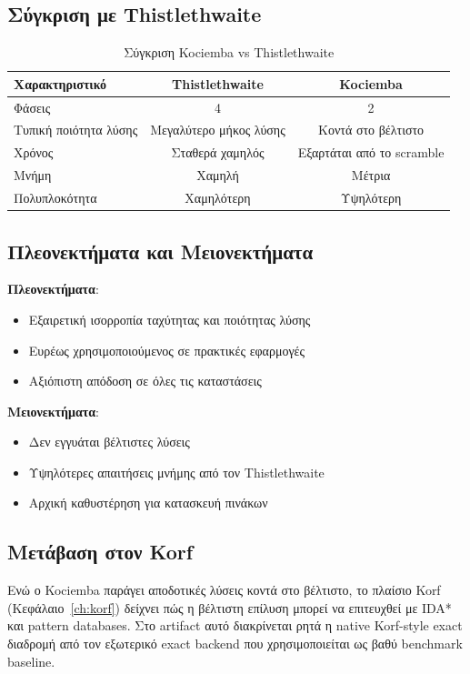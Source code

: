 \subsection{Σύγκριση με Thistlethwaite}

\begin{table}[h]
\centering
\caption{Σύγκριση Kociemba vs Thistlethwaite}
\label{tab:kociemba_vs_thistlethwaite}
\begin{tabular}{lcc}
\toprule
\textbf{Χαρακτηριστικό} & \textbf{Thistlethwaite} & \textbf{Kociemba} \\
\midrule
Φάσεις & 4 & 2 \\
Τυπική ποιότητα λύσης & Μεγαλύτερο μήκος λύσης & Κοντά στο βέλτιστο \\
Χρόνος & Σταθερά χαμηλός & Εξαρτάται από το scramble \\
Μνήμη & Χαμηλή & Μέτρια \\
Πολυπλοκότητα & Χαμηλότερη & Υψηλότερη \\
\bottomrule
\end{tabular}
\end{table}

\subsection{Πλεονεκτήματα και Μειονεκτήματα}

\textbf{Πλεονεκτήματα}:
\begin{itemize}
    \item Εξαιρετική ισορροπία ταχύτητας και ποιότητας λύσης
    \item Ευρέως χρησιμοποιούμενος σε πρακτικές εφαρμογές
    \item Αξιόπιστη απόδοση σε όλες τις καταστάσεις
\end{itemize}

\textbf{Μειονεκτήματα}:
\begin{itemize}
    \item Δεν εγγυάται βέλτιστες λύσεις
    \item Υψηλότερες απαιτήσεις μνήμης από τον Thistlethwaite
    \item Αρχική καθυστέρηση για κατασκευή πινάκων
\end{itemize}

\subsection{Μετάβαση στον Korf}

Ενώ ο Kociemba παράγει αποδοτικές λύσεις κοντά στο βέλτιστο, το πλαίσιο Korf
(Κεφάλαιο~\ref{ch:korf}) δείχνει πώς η βέλτιστη επίλυση μπορεί να επιτευχθεί
με IDA* και pattern databases. Στο artifact αυτό διακρίνεται ρητά η native
Korf-style exact διαδρομή από τον εξωτερικό exact backend που χρησιμοποιείται
ως βαθύ benchmark baseline.

